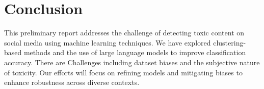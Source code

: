 \section{Conclusion}

This preliminary report addresses the challenge of detecting toxic content on social media using machine learning techniques. We have explored clustering-based methods and the use of large language models to improve classification accuracy. There are Challenges including dataset biases and the subjective nature of toxicity. 
Our efforts will focus on refining models and mitigating biases to enhance robustness across diverse contexts.


